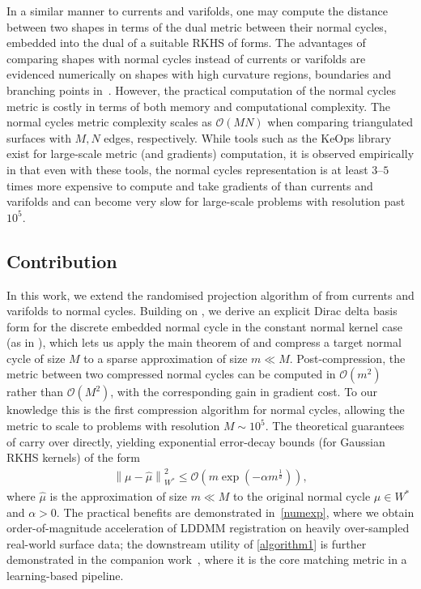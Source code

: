 \documentclass[sn-mathphys-num]{sn-jnl}%
\theoremstyle{thmstyleone}%
\theoremstyle{thmstyletwo}%
\theoremstyle{thmstylethree}%
\numberwithin{remark}{section}
\numberwithin{definition}{section}
\numberwithin{equation}{section}
\numberwithin{theorem}{section}
\newcommand{\norm}[1]{\left\lVert#1\right\rVert}
\begin{document}
In a similar manner to currents and varifolds, one may compute the distance between two shapes in terms of the dual metric between their normal cycles, embedded into the dual of a suitable RKHS of forms. The advantages of comparing shapes with normal cycles instead of currents or varifolds are evidenced numerically  on shapes with high curvature regions, boundaries and branching points in~\cite{NCpaper}. However,  the practical computation of the normal cycles metric is costly in terms of both  memory and computational complexity. The normal cycles metric complexity scales as $\mathcal{O}(MN)$ when comparing triangulated surfaces with $M,N$ edges, respectively. While tools such as the KeOps library \cite{Keops} exist for large-scale metric (and gradients) computation, it is observed empirically in \cite{NCpaper} that even with these tools, the normal cycles representation is at least $3$--$5$ times more expensive to compute and take gradients of than currents and varifolds and can become very slow for large-scale problems with resolution past $10^{5}$. 


\subsection{Contribution}
In this work, we extend the randomised projection algorithm of \cite{SparseNystromCurrVar} from currents and varifolds to normal cycles. Building on \cite{NCpaper}, we derive an explicit Dirac delta basis form for the discrete embedded normal cycle in the constant normal kernel case (as in \cite{NCpaper}), which lets us apply the main theorem of \cite{SparseNystromCurrVar} and compress a target normal cycle of size $M$ to a sparse approximation of size $m\ll M$. Post-compression, the metric between two compressed normal cycles can be computed in $\mathcal{O}(m^{2})$ rather than $\mathcal{O}(M^{2})$, with the corresponding gain in gradient cost. To our knowledge this is the first compression algorithm for normal cycles, allowing the metric to scale to problems with resolution $M\sim 10^{5}$. The theoretical guarantees of \cite{SparseNystromCurrVar} carry over directly, yielding exponential error-decay bounds (for Gaussian RKHS kernels) of the form
\begin{align*}
    \norm{\mu - \hat{\mu}}_{W^{*}}^{2} \leq \mathcal{O}(m\exp(-\alpha m^{\frac{1}{d}})),
\end{align*}
where $\hat{\mu}$ is the approximation of size $m\ll M$ to the original normal cycle $\mu \in W^{*}$ and $\alpha>0$. The practical benefits are demonstrated in~\cref{numexp}, where we obtain order-of-magnitude acceleration of LDDMM registration on heavily over-sampled real-world surface data; the downstream utility of \cref{algorithm1} is further demonstrated in the companion work~\cite{CurvatureEnthusiasm}, where it is the core matching metric in a learning-based pipeline.
\end{document}
